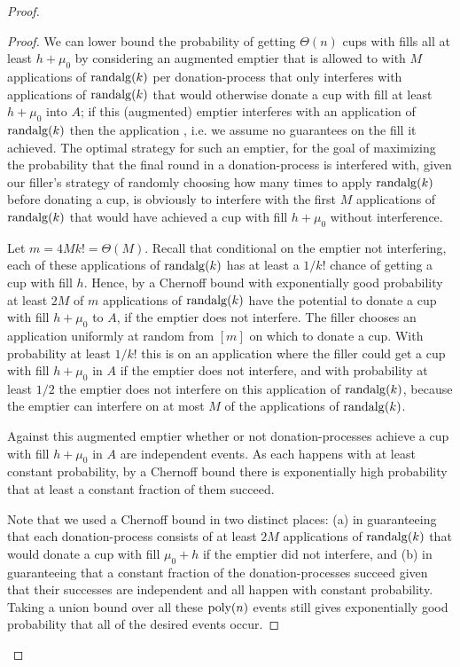 \begin{proof}
\begin{proof}
  We can lower bound the probability of getting $\Theta(n)$ cups
  with fills all at least $h + \mu_0$ by considering an augmented
  emptier that is allowed to  with $M$
  applications of $\operatorname{\text{\textup{randalg}}}(k)$ per donation-process that only
  interferes with applications of $\operatorname{\text{\textup{randalg}}}(k)$ that would
  otherwise donate a cup with fill at least $h + \mu_0$ into $A$;
  if this (augmented) emptier interferes with an application of
  $\operatorname{\text{\textup{randalg}}}(k)$ then the application , i.e.
  we assume no guarantees on the fill it achieved.
  The optimal strategy for such an emptier, for the goal of
  maximizing the probability that the final round in a
  donation-process is interfered with, given our filler's
  strategy of randomly choosing how many times to apply
  $\operatorname{\text{\textup{randalg}}}(k)$ before donating a cup, is obviously to interfere
  with the first $M$ applications of $\operatorname{\text{\textup{randalg}}}(k)$ that would
  have achieved a cup with fill $h+\mu_0$ without interference. 

  Let $m = 4M k! = \Theta(M)$. Recall that conditional on the
  emptier not interfering, each of these applications of
  $\operatorname{\text{\textup{randalg}}}(k)$ has at least a $1/k!$ chance of getting a cup
  with fill $h$. Hence, by a Chernoff bound with exponentially
  good probability at least $2M$ of $m$ applications of
  $\operatorname{\text{\textup{randalg}}}(k)$ have the potential to donate a cup with fill
  $h+\mu_0$ to $A$, if the emptier does not interfere. The filler
  chooses an application uniformly at random from $[m]$ on which
  to donate a cup. With probability at least $1/k!$ this is on an
  application where the filler could get a cup with fill
  $h+\mu_0$ in $A$ if the emptier does not interfere, and with
  probability at least $1/2$ the emptier does not interfere on
  this application of $\operatorname{\text{\textup{randalg}}}(k)$, because the emptier can
  interfere on at most $M$ of the applications of $\operatorname{\text{\textup{randalg}}}(k)$. 

  Against this augmented emptier whether or not
  donation-processes achieve a cup with fill $h+\mu_0$ in $A$ are
  independent events. As each happens with at least constant
  probability, by a Chernoff bound there is exponentially high
  probability that at least a constant fraction of them succeed.

  Note that we used a Chernoff bound in two distinct places: (a)
  in guaranteeing that each donation-process consists of at least
  $2M$ applications of $\operatorname{\text{\textup{randalg}}}(k)$ that would donate a cup with
  fill $\mu_0 + h$ if the emptier did not interfere, and (b) in
  guaranteeing that a constant fraction of the donation-processes
  succeed given that their successes are independent and all
  happen with constant probability. Taking a union bound over all
  these $\operatorname{\text{poly}}(n)$ events still gives exponentially good
  probability that all of the desired events occur.


\end{proof}
\end{proof}
